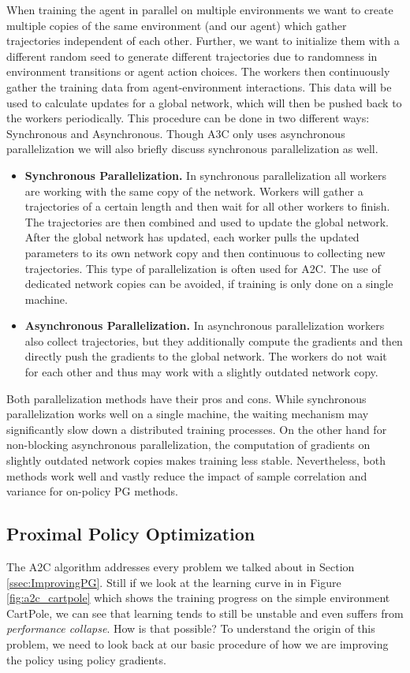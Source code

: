 When training the agent in parallel on multiple environments we want to create multiple copies of the same environment (and our agent) which gather trajectories independent of each other. Further, we want to initialize them with a different random seed to generate different trajectories due to randomness in environment transitions or agent action choices. The workers then continuously gather the training data from agent-environment interactions. This data will be used to calculate updates for a global network, which will then be pushed back to the workers periodically. This procedure can be done in two different ways: Synchronous and Asynchronous. Though A3C only uses asynchronous parallelization we will also briefly discuss synchronous parallelization as well.
\begin{itemize}
  \item \textbf{Synchronous Parallelization.} In synchronous parallelization all workers are working with the same copy of the network. Workers will gather a trajectories of a certain length and then wait for all other workers to finish. The trajectories are then combined and used to update the global network. After the global network has updated, each worker pulls the updated parameters to its own network copy and then continuous to collecting new trajectories. This type of parallelization is often used for A2C. The use of dedicated network copies can be avoided, if training is only done on a single machine.
  \item \textbf{Asynchronous Parallelization.} In asynchronous parallelization workers also collect trajectories, but they additionally compute the gradients and then directly push the gradients to the global network. The workers do not wait for each other and thus may work with a slightly outdated network copy. 
\end{itemize}
Both parallelization methods have their pros and cons. While synchronous parallelization works well on a single machine, the waiting mechanism may significantly slow down a distributed training processes. On the other hand for non-blocking asynchronous parallelization, the computation of gradients on slightly outdated network copies makes training less stable. Nevertheless, both methods work well and vastly reduce the impact of sample correlation and variance for on-policy PG methods. 


\subsection{Proximal Policy Optimization} \label{ssec:PPO}
The A2C algorithm addresses every problem we talked about in Section \ref{ssec:ImprovingPG}. Still if we look at the learning curve in in Figure \ref{fig:a2c_cartpole} which shows the training progress on the simple environment CartPole, we can see that learning tends to still be unstable and even suffers from \textit{performance collapse}. How is that possible? To understand the origin of this problem, we need to look back at our basic procedure of how we are improving the policy using policy gradients.

